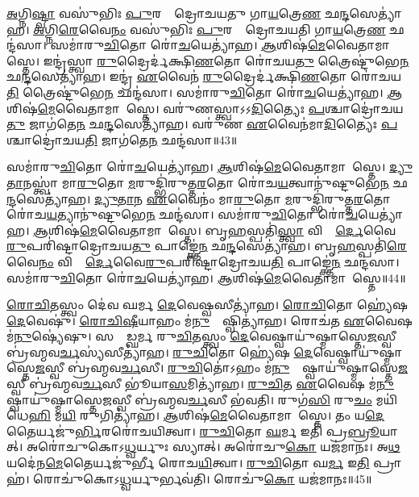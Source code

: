 \ul{𑌅}𑌗𑍍𑌨𑌿\ul{𑌷𑍍𑌟𑍍𑌵𑌾} 𑌵𑌸𑍁॑𑌭𑌿𑌃 \ul{𑌪𑍁}𑌰𑌸𑍍𑌤𑌾᳚𑌦𑍍𑌰𑍋𑌚𑌯𑌤𑍁 𑌗𑌾\ul{𑌯}𑌤𑍍𑌰𑍇\ul{𑌣} 𑌛\ul{𑌨𑍍𑌦}𑌸𑍇𑌤𑍍𑌯𑌾॑𑌹। 
\ul{𑌅}𑌗𑍍𑌨𑌿\ul{𑌰𑍇}𑌵𑍈\ul{𑌨𑌂} 𑌵𑌸𑍁॑𑌭𑌿𑌃 \ul{𑌪𑍁}𑌰𑌸𑍍𑌤𑌾᳚𑌦𑍍𑌰𑍋𑌚𑌯𑌤𑌿 𑌗𑌾\ul{𑌯}𑌤𑍍𑌰𑍇\ul{𑌣} 𑌛𑌨𑍍𑌦॑𑌸𑌾। 
𑌸𑌮𑌾॑𑌰𑍁\ul{𑌚𑌿}𑌤𑍋 𑌰𑍋॑\ul{𑌚}𑌯𑍇𑌤𑍍𑌯𑌾॑𑌹। 
\ul{𑌆}𑌶𑌿𑌷॑\ul{𑌮𑍇}𑌵𑍈𑌤𑌾𑌮𑌾𑌶𑌾᳚𑌸𑍍𑌤𑍇। 
𑌇𑌨𑍍𑌦𑍍𑌰॑𑌸𑍍𑌤𑍍𑌵𑌾 \ul{𑌰𑍁}𑌦𑍍𑌰𑍈𑌰𑍍𑌦॑𑌕𑍍𑌷𑌿\ul{𑌣}𑌤𑍋 𑌰𑍋॑𑌚𑌯\ul{𑌤𑍁} 𑌤𑍍𑌰𑍈𑌷𑍍𑌟𑍁॑𑌭𑍇\ul{𑌨} 𑌛\ul{𑌨𑍍𑌦}𑌸𑍇𑌤𑍍𑌯𑌾॑𑌹। 
𑌇𑌨𑍍𑌦𑍍𑌰॑ \ul{𑌏}𑌵𑍈𑌨॑ \ul{𑌰𑍁}𑌦𑍍𑌰𑍈𑌰𑍍𑌦॑𑌕𑍍𑌷𑌿\ul{𑌣}𑌤𑍋 𑌰𑍋॑𑌚𑌯\ul{𑌤𑌿} 𑌤𑍍𑌰𑍈𑌷𑍍𑌟𑍁॑𑌭𑍇\ul{𑌨} 𑌛𑌨𑍍𑌦॑𑌸𑌾। 
𑌸𑌮𑌾॑𑌰𑍁\ul{𑌚𑌿}𑌤𑍋 𑌰𑍋॑\ul{𑌚}𑌯𑍇𑌤𑍍𑌯𑌾॑𑌹। 
\ul{𑌆}𑌶𑌿𑌷॑\ul{𑌮𑍇}𑌵𑍈𑌤𑌾𑌮𑌾𑌶𑌾᳚𑌸𑍍𑌤𑍇। 
𑌵𑌰𑍁॑𑌣𑌸𑍍𑌤𑍍𑌵𑌾𑌽𑌽\ul{𑌦𑌿}𑌤𑍍𑌯𑍈𑌃 \ul{𑌪}𑌶𑍍𑌚𑌾𑌦𑍍𑌰𑍋॑𑌚𑌯\ul{𑌤𑍁} 𑌜𑌾𑌗॑𑌤𑍇\ul{𑌨} 𑌛\ul{𑌨𑍍𑌦}𑌸𑍇𑌤𑍍𑌯𑌾॑𑌹। 
𑌵𑌰𑍁॑𑌣 \ul{𑌏}𑌵𑍈𑌨॑𑌮𑌾\ul{𑌦𑌿}𑌤𑍍𑌯𑍈𑌃 \ul{𑌪}𑌶𑍍𑌚𑌾𑌦𑍍𑌰𑍋॑𑌚𑌯\ul{𑌤𑌿} 𑌜𑌾𑌗॑𑌤𑍇\ul{𑌨} 𑌛𑌨𑍍𑌦॑𑌸𑌾॥43॥

𑌸𑌮𑌾॑𑌰𑍁\ul{𑌚𑌿}𑌤𑍋 𑌰𑍋॑\ul{𑌚}𑌯𑍇𑌤𑍍𑌯𑌾॑𑌹। 
\ul{𑌆}𑌶𑌿𑌷॑\ul{𑌮𑍇}𑌵𑍈𑌤𑌾𑌮𑌾𑌶𑌾᳚𑌸𑍍𑌤𑍇। 
\ul{𑌦𑍍𑌯𑍁}\ul{𑌤𑌾}𑌨𑌸𑍍𑌤𑍍𑌵𑌾॑ 𑌮𑌾\ul{𑌰𑍁}𑌤𑍋 \ul{𑌮}𑌰𑍁𑌦𑍍𑌭𑌿॑𑌰𑍁𑌤𑍍𑌤\ul{𑌰}𑌤𑍋 𑌰𑍋॑𑌚\ul{𑌯}𑌤𑍍𑌵𑌾𑌨𑍁॑𑌷𑍍𑌟𑍁𑌭𑍇\ul{𑌨} 𑌛\ul{𑌨𑍍𑌦}𑌸𑍇𑌤𑍍𑌯𑌾॑𑌹। 
\ul{𑌦𑍍𑌯𑍁}\ul{𑌤𑌾}𑌨 \ul{𑌏}𑌵𑍈𑌨𑌂॑ 𑌮𑌾\ul{𑌰𑍁}𑌤𑍋 \ul{𑌮}𑌰𑍁𑌦𑍍𑌭𑌿॑𑌰𑍁𑌤𑍍𑌤\ul{𑌰}𑌤𑍋 𑌰𑍋॑𑌚\ul{𑌯}𑌤𑍍𑌯𑌾𑌨𑍁॑𑌷𑍍𑌟𑍁𑌭𑍇\ul{𑌨} 𑌛𑌨𑍍𑌦॑𑌸𑌾। 
𑌸𑌮𑌾॑𑌰𑍁\ul{𑌚𑌿}𑌤𑍋 𑌰𑍋॑\ul{𑌚}𑌯𑍇𑌤𑍍𑌯𑌾॑𑌹। 
\ul{𑌆}𑌶𑌿𑌷॑\-\ul{𑌮𑍇}𑌵𑍈𑌤𑌾𑌮𑌾𑌶𑌾᳚𑌸𑍍𑌤𑍇। 
𑌬𑍃\ul{𑌹}𑌸𑍍𑌪𑌤𑌿॑\ul{𑌸𑍍𑌤𑍍𑌵𑌾} 𑌵𑌿𑌶𑍍𑌵𑍈᳚\ul{𑌰𑍍𑌦𑍇}𑌵𑍈\ul{𑌰𑍁}𑌪𑌰𑌿॑𑌷𑍍𑌟𑌾\-𑌦𑍍𑌰𑍋𑌚𑌯\ul{𑌤𑍁} 𑌪𑌾𑌙𑍍𑌕𑍍𑌤𑍇॑\ul{𑌨} 𑌛\ul{𑌨𑍍𑌦}𑌸𑍇𑌤𑍍𑌯𑌾॑𑌹। 
𑌬𑍃\ul{𑌹}𑌸𑍍𑌪𑌤𑌿॑\ul{𑌰𑍇}𑌵𑍈\ul{𑌨𑌂}  𑌵𑌿𑌶𑍍𑌵𑍈᳚\ul{𑌰𑍍𑌦𑍇}𑌵𑍈\-\ul{𑌰𑍁}𑌪𑌰𑌿॑𑌷𑍍𑌟𑌾𑌦𑍍𑌰𑍋𑌚𑌯\ul{𑌤𑌿} 𑌪𑌾𑌙𑍍𑌕𑍍𑌤𑍇॑\ul{𑌨} 𑌛𑌨𑍍𑌦॑𑌸𑌾। 
𑌸𑌮𑌾॑𑌰𑍁\ul{𑌚𑌿}𑌤𑍋 𑌰𑍋॑\ul{𑌚}𑌯𑍇𑌤𑍍𑌯𑌾॑𑌹। 
\ul{𑌆}𑌶𑌿𑌷॑\ul{𑌮𑍇}𑌵𑍈𑌤𑌾𑌮𑌾𑌶𑌾᳚𑌸𑍍𑌤𑍇॥44॥

\ul{𑌰𑍋}\ul{𑌚𑌿}𑌤𑌸𑍍𑌤𑍍𑌵𑌂 𑌦𑍇॑𑌵 𑌘𑌰𑍍𑌮 \ul{𑌦𑍇}𑌵𑍇𑌷𑍍𑌵𑌸𑍀𑌤𑍍𑌯𑌾॑𑌹। 
\ul{𑌰𑍋}\ul{𑌚𑌿}𑌤𑍋 𑌹𑍍𑌯𑍇॑𑌷 \ul{𑌦𑍇}𑌵𑍇𑌷𑍁॑। 
\ul{𑌰𑍋}\ul{𑌚𑌿}\ul{𑌷𑍀}𑌯𑌾𑌹𑌂 𑌮॑\ul{𑌨𑍁}𑌷𑍍𑌯𑍇᳚𑌷𑍍𑌵𑌿𑌤𑍍𑌯𑌾॑𑌹। 
𑌰𑍋𑌚॑𑌤 \ul{𑌏}𑌵𑍈𑌷 𑌮॑\ul{𑌨𑍁}𑌷𑍍𑌯𑍇॑𑌷𑍁। 
𑌸𑌮𑍍𑌰𑌾᳚𑌡𑍍𑌘𑌰𑍍𑌮 𑌰𑍁\ul{𑌚𑌿}𑌤𑌸𑍍𑌤𑍍𑌵𑌂 \ul{𑌦𑍇}𑌵𑍇𑌷𑍍𑌵𑌾𑌯𑍁॑𑌷𑍍𑌮𑌾𑌸𑍍𑌤𑍇\ul{𑌜}𑌸𑍍𑌵𑍀 𑌬𑍍𑌰॑𑌹𑍍𑌮𑌵\ul{𑌰𑍍𑌚}𑌸𑍍𑌯॑𑌸𑍀𑌤𑍍𑌯𑌾॑𑌹। 
\ul{𑌰𑍁}\ul{𑌚𑌿}𑌤𑍋 𑌹𑍍𑌯𑍇॑𑌷 \ul{𑌦𑍇}𑌵𑍇𑌷𑍍𑌵𑌾𑌯𑍁॑𑌷𑍍𑌮𑌾𑌸𑍍𑌤𑍇\ul{𑌜}𑌸𑍍𑌵𑍀 𑌬𑍍𑌰॑𑌹𑍍𑌮𑌵\ul{𑌰𑍍𑌚}𑌸𑍀। 
\ul{𑌰𑍁}\ul{𑌚𑌿}𑌤𑍋॑𑌽𑌹𑌂 𑌮॑\ul{𑌨𑍁}𑌷𑍍𑌯𑍇᳚𑌷𑍍𑌵𑌾𑌯𑍁॑𑌷𑍍𑌮𑌾𑌸𑍍𑌤𑍇\ul{𑌜}𑌸𑍍𑌵𑍀 𑌬𑍍𑌰॑𑌹𑍍𑌮𑌵\ul{𑌰𑍍𑌚}𑌸𑍀 𑌭𑍂॑𑌯𑌾\ul{𑌸}𑌮𑌿𑌤𑍍𑌯𑌾॑𑌹। 
\ul{𑌰𑍁}\ul{𑌚𑌿}𑌤 \ul{𑌏}𑌵𑍈𑌷 𑌮॑\ul{𑌨𑍁}𑌷𑍍𑌯𑍇᳚𑌷𑍍𑌵𑌾𑌯𑍁॑𑌷𑍍𑌮𑌾𑌸𑍍𑌤𑍇\ul{𑌜}𑌸𑍍𑌵𑍀 𑌬𑍍𑌰॑𑌹𑍍𑌮𑌵\ul{𑌰𑍍𑌚}𑌸𑍀 𑌭॑𑌵𑌤𑌿। 
𑌰𑍁𑌗॑\ul{𑌸𑌿} 𑌰𑍁\ul{𑌚𑌂} 𑌮𑌯𑌿॑ 𑌧𑍇\ul{𑌹𑌿} 𑌮\ul{𑌯𑌿} 𑌰𑍁𑌗𑌿𑌤𑍍𑌯𑌾॑𑌹। 
\ul{𑌆}𑌶𑌿𑌷॑\ul{𑌮𑍇}𑌵𑍈𑌤𑌾𑌮𑌾𑌶𑌾᳚𑌸𑍍𑌤𑍇। 
𑌤𑌂 𑌯\ul{𑌦𑍇}𑌤𑍈𑌰𑍍𑌯𑌜𑍁॑\ul{𑌰𑍍𑌭𑌿}𑌰𑌰𑍋॑𑌚𑌯𑌿𑌤𑍍𑌵𑌾। 
\ul{𑌰𑍁}\ul{𑌚𑌿}𑌤𑍋 \ul{𑌘}𑌰𑍍𑌮 𑌇𑌤𑌿॑ 𑌪𑍍𑌰\ul{𑌬𑍍𑌰𑍂}𑌯𑌾𑌤𑍍। 
𑌅𑌰𑍋॑𑌚𑍁𑌕𑍋𑌽\ul{𑌧𑍍𑌵}𑌰𑍍𑌯𑍁𑌃 𑌸𑍍𑌯𑌾𑌤𑍍। 
𑌅𑌰𑍋॑𑌚𑍁\ul{𑌕𑍋} 𑌯𑌜॑𑌮𑌾𑌨𑌃। 
𑌅\ul{𑌥} 𑌯𑌦𑍇॑𑌨\ul{𑌮𑍇}𑌤𑍈𑌰𑍍𑌯𑌜𑍁॑𑌰𑍍𑌭𑍀 𑌰𑍋𑌚\ul{𑌯𑌿}𑌤𑍍𑌵𑌾। 
\ul{𑌰𑍁}\ul{𑌚𑌿}𑌤𑍋 𑌘\ul{𑌰𑍍𑌮} 𑌇\ul{𑌤𑌿} 𑌪𑍍𑌰𑌾𑌹॑। 
𑌰𑍋𑌚𑍁॑𑌕𑍋𑌽\ul{𑌧𑍍𑌵}𑌰𑍍𑌯𑍁𑌰𑍍𑌭𑌵॑𑌤𑌿। 
𑌰𑍋𑌚𑍁॑\ul{𑌕𑍋} 𑌯𑌜॑𑌮𑌾𑌨𑌃॥45॥
\anuvakamend[\ul{𑌪}𑌶𑍍𑌚𑌾𑌦𑍍𑌰𑍋॑𑌚𑌯\ul{𑌤𑌿} 𑌜𑌾𑌗॑𑌤𑍇\ul{𑌨} 𑌛𑌨𑍍𑌦॑\ul{𑌸𑌾} 𑌪𑌾𑌙𑍍𑌕𑍍𑌤𑍇॑\ul{𑌨} 𑌛𑌨𑍍𑌦॑\ul{𑌸𑌾} 𑌸𑌮𑌾॑𑌰𑍁\ul{𑌚𑌿}𑌤𑍋 𑌰𑍋॑\ul{𑌚}𑌯𑍇𑌤𑍍𑌯𑌾॑\ul{𑌹𑌾}𑌶𑌿𑌷॑\ul{𑌮𑍇}𑌵𑍈𑌤𑌾𑌮𑌾𑌶𑌾᳚𑌸𑍍𑌤𑍇 𑌶𑌾\ul{𑌸𑍍𑌤𑍇}𑌽𑌷𑍍𑌟𑍗 𑌚॑]

